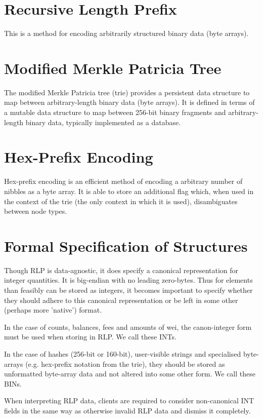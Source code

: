 \documentclass[9pt,oneside]{amsart}
\begin{document}
\section{Recursive Length Prefix}\label{app:rlp}
This is a method for encoding arbitrarily structured binary data (byte arrays).

\section{Modified Merkle Patricia Tree}\label{app:trie}
The modified Merkle Patricia tree (trie) provides a persistent data structure to map between arbitrary-length binary data (byte arrays). It is defined in terms of a mutable data structure to map between 256-bit binary fragments and arbitrary-length binary data, typically implemented as a database.

\section{Hex-Prefix Encoding}\label{app:hexprefix}
Hex-prefix encoding is an efficient method of encoding a arbitrary number of nibbles as a byte array. It is able to store an additional flag which, when used in the context of the trie (the only context in which it is used), disambiguates between node types.

\section{Formal Specification of Structures}
Though RLP is data-agnostic, it does specify a canonical representation for integer quantities. It is big-endian with no leading zero-bytes. Thus for elements than feasibly can be stored as integers, it becomes important to specify whether they should adhere to this canonical representation or be left in some other (perhaps more 'native') format.

In the case of counts, balances, fees and amounts of wei, the canon-integer form must be used when storing in RLP. We call these INTs.

In the case of hashes (256-bit or 160-bit), user-visible strings and specialised byte-arrays (e.g. hex-prefix notation from the trie), they should be stored as unformatted byte-array data and not altered into some other form. We call these BINs.

When interpreting RLP data, clients are required to consider non-canonical INT fields in the same way as otherwise invalid RLP data and dismiss it completely.
\end{document}
